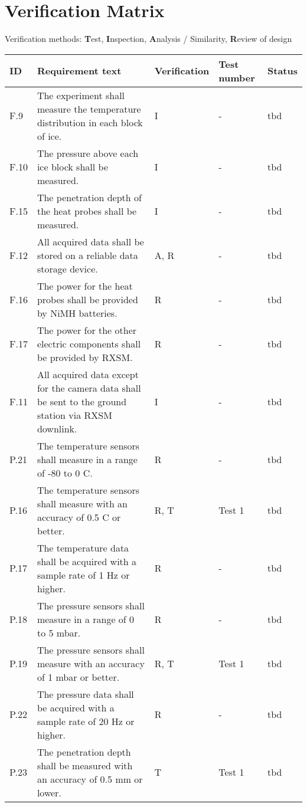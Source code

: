 \documentclass[11pt]{scrartcl}
\begin{document}
 \section{Verification Matrix}
 
 Verification methods: \textbf{T}est, \textbf{I}nspection, \textbf{A}nalysis / Similarity, \textbf{R}eview of design
 
 \begin{center}
	\begin{longtable}{| p{} | p{} | p{} | p{} | p{} |}
		\hline
		ID & Requirement text & Verification & Test number & Status \\
		\hline
		F.9 & The experiment shall measure the temperature distribution in each block of ice. & I & - & tbd \\
		F.10 & The pressure above each ice block shall be measured. & I & - & tbd \\
		F.15 & The penetration depth of the heat probes shall be measured. & I & - & tbd \\
		F.12 & All acquired data shall be stored on a reliable data storage device. & A, R & - & tbd \\
		F.16 & The power for the heat probes shall be provided by NiMH batteries. & R & - & tbd \\
		F.17 & The power for the other electric components shall be provided by RXSM. & R & - & tbd \\
		F.11 & All acquired data except for the camera data shall be sent to the ground station via RXSM downlink. & I & - & tbd \\
		\hline
		P.21 & The temperature sensors shall measure in a range of -80 to 0 \textdegree C. & R & - & tbd \\
		P.16 & The temperature sensors shall measure with an accuracy of 0.5 \textdegree C or better. & R, T & Test 1 & tbd \\
		P.17 & The temperature data shall be acquired with a sample rate of 1 Hz or higher. & R & - & tbd \\
		P.18 & The pressure sensors shall measure in a range of 0 to 5 mbar. & R & - & tbd \\
		P.19 & The pressure sensors shall measure with an accuracy of 1 mbar or better. & R, T & Test 1 & tbd \\
		P.22 & The pressure data shall be acquired with a sample rate of 20 Hz or higher\textsl{}. & R & - & tbd \\
		P.23 & The penetration depth shall be measured with an accuracy of 0.5 mm or lower. & T & Test 1 & tbd \\

\end{longtable}
\end{center}
\end{document}
